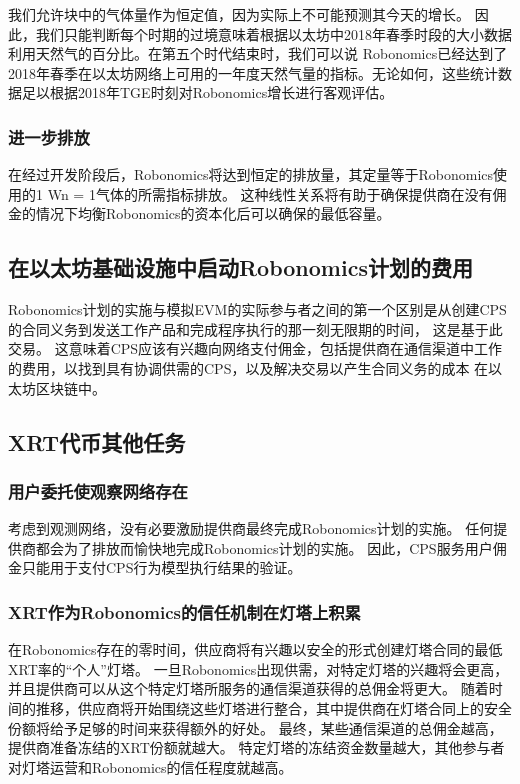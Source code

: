 \documentclass[UTF8]{article}
\begin{document}
我们允许块中的气体量作为恒定值，因为实际上不可能预测其今天的增长。 因此，我们只能判断每个时期的过境意味着根据以太坊中2018年春季时段的大小数据利用天然气的百分比。在第五个时代结束时，我们可以说 Robonomics已经达到了2018年春季在以太坊网络上可用的一年度天然气量的指标。无论如何，这些统计数据足以根据2018年TGE时刻对Robonomics增长进行客观评估。

\subsubsection{进一步排放}

在经过开发阶段后，Robonomics将达到恒定的排放量，其定量等于Robonomics使用的1 Wn = 1气体的所需指标排放。 这种线性关系将有助于确保提供商在没有佣金的情况下均衡Robonomics的资本化后可以确保的最低容量。

\subsection{在以太坊基础设施中启动Robonomics计划的费用}

Robonomics计划的实施与模拟EVM的实际参与者之间的第一个区别是从创建CPS的合同义务到发送工作产品和完成程序执行的那一刻无限期的时间， 这是基于此交易。 这意味着CPS应该有兴趣向网络支付佣金，包括提供商在通信渠道中工作的费用，以找到具有协调供需的CPS，以及解决交易以产生合同义务的成本 在以太坊区块链中。

\subsection{XRT代币其他任务}
\subsubsection{用户委托使观察网络存在}

考虑到观测网络，没有必要激励提供商最终完成Robonomics计划的实施。 任何提供商都会为了排放而愉快地完成Robonomics计划的实施。 因此，CPS服务用户佣金只能用于支付CPS行为模型执行结果的验证。

\subsubsection{XRT作为Robonomics的信任机制在灯塔上积累}

在Robonomics存在的零时间，供应商将有兴趣以安全的形式创建灯塔合同的最低XRT率的“个人”灯塔。 一旦Robonomics出现供需，对特定灯塔的兴趣将会更高，并且提供商可以从这个特定灯塔所服务的通信渠道获得的总佣金将更大。 随着时间的推移，供应商将开始围绕这些灯塔进行整合，其中提供商在灯塔合同上的安全份额将给予足够的时间来获得额外的好处。 最终，某些通信渠道的总佣金越高，提供商准备冻结的XRT份额就越大。 特定灯塔的冻结资金数量越大，其他参与者对灯塔运营和Robonomics的信任程度就越高。
\end{document}
